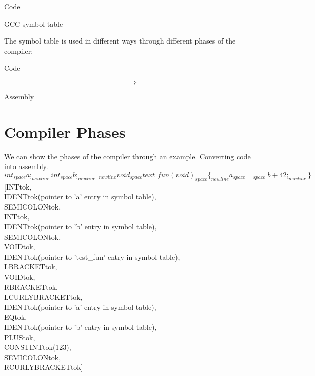 \documentclass{report}
\begin{document}
\begin{minipage}[t]{0.45\textwidth}
	\centerline{Code}
\end{minipage}
\hfill
\begin{minipage}[t]{0.45\textwidth}
	\centerline{GCC symbol table}
	
\end{minipage}


The symbol table is used in different ways through different phases of the compiler:
\begin{minipage}[t]{0.45\textwidth}
	\centerline{Code}
\end{minipage}
\begin{minipage}[t]{0.1\textwidth}
	\huge
	\[\Rightarrow\]
\end{minipage}
\begin{minipage}[t]{0.45\textwidth}
	\centerline{Assembly}
\end{minipage}
\section*{Compiler Phases}
We can show the phases of the compiler through an example. Converting  code into  assembly.
\[int_{space}a;_{newline}int_{space}b;_{newline} \ _{newline}void_{space}text\_fun(void)_{space}\{_{newline}a_{space}=_{space}b+42;_{newline}\}\]
[INTtok,
\\ IDENTtok(pointer to 'a' entry in symbol table),
\\ SEMICOLONtok,
\\ INTtok,
\\ IDENTtok(pointer to 'b' entry in symbol table),
\\ SEMICOLONtok,
\\ VOIDtok,
\\ IDENTtok(pointer to 'test\_fun' entry in symbol table),
\\ LBRACKETtok,
\\ VOIDtok,
\\ RBRACKETtok,
\\ LCURLYBRACKETtok,
\\ IDENTtok(pointer to 'a' entry in symbol table),
\\ EQtok,
\\ IDENTtok(pointer to 'b' entry in symbol table),
\\ PLUStok,
\\ CONSTINTtok(123),
\\ SEMICOLONtok,
\\ RCURLYBRACKETtok]
\end{document}
